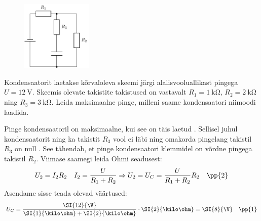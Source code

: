 \setAuthor{}

\begin{figure}
\vspace{-45pt}
	\begin{center}
		\includegraphics[width = 0.30\textwidth]{2019-v2g-06-yl.pdf}
	\end{center}
\end{figure}


Kondensaatorit laetakse kõrvaloleva skeemi järgi alalisvooluallikast pingega $U=\SI{12}{\V}$. Skeemis olevate takistite takistused on vastavalt $R_1=\SI{1}{\kilo\ohm}$, $R_2=\SI{2}{\kilo\ohm}$ ning $R_3=\SI{3}{\kilo\ohm}$. Leida maksimaalne pinge, milleni saame kondensaatori niimoodi laadida. 
\vspace{10pt}

\hint

\solu
Pinge kondensaatoril on  maksimaalne, kui see on täis laetud . Sellisel juhul kondensaatorit ning ka takistit $R_3$ vool ei läbi  ning omakorda pingelang takistil $R_3$ on null . See tähendab, et pinge kondensaatori klemmidel on võrdne pingega takistil $R_2$.  Viimase saamegi leida Ohmi seadusest:
$$U_2=I_2R_2 \quad I_2=\frac{U}{R_1+R_2} \Rightarrow U_2=U_C=\frac{U}{R_1+R_2}R_2\quad\pp{2}$$
Asendame sisse teada olevad väärtused:
$$U_C=\frac{\SI{12}{\V}}{\SI{1}{\kilo\ohm}+\SI{2}{\kilo\ohm}}\cdot\SI{2}{\kilo\ohm}=\SI{8}{\V}\quad\pp{1}$$
\probend